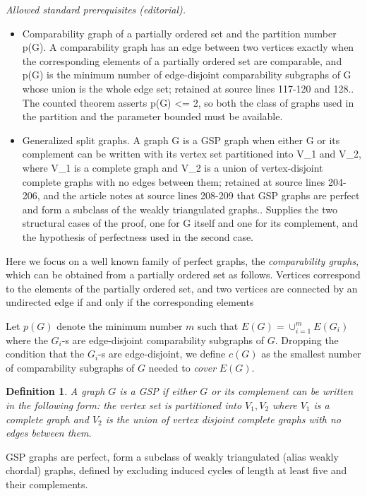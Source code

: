 \documentclass[12pt]{article}
\newtheorem{definition}{Definition}
\begin{document}
\noindent\textit{Allowed standard prerequisites (editorial).}\begin{itemize}
\item Comparability graph of a partially ordered set and the partition number p(G). A comparability graph has an edge between two vertices exactly when the corresponding elements of a partially ordered set are comparable, and p(G) is the minimum number of edge-disjoint comparability subgraphs of G whose union is the whole edge set; retained at source lines 117-120 and 128.. The counted theorem asserts p(G) <= 2, so both the class of graphs used in the partition and the parameter bounded must be available.
\item Generalized split graphs. A graph G is a GSP graph when either G or its complement can be written with its vertex set partitioned into V\_1 and V\_2, where V\_1 is a complete graph and V\_2 is a union of vertex-disjoint complete graphs with no edges between them; retained at source lines 204-206, and the article notes at source lines 208-209 that GSP graphs are perfect and form a subclass of the weakly triangulated graphs.. Supplies the two structural cases of the proof, one for G itself and one for its complement, and the hypothesis of perfectness used in the second case.
\end{itemize}\medskip
Here we focus on a well known family of perfect graphs, the {\em comparability graphs},
which can be obtained from a partially ordered set as follows.
Vertices correspond to the elements of the partially ordered set,
and two vertices are connected by an undirected edge if and only if the corresponding elements

Let $p(G)$ denote the minimum number $m$ such that $E(G)=\cup_{i=1}^m E(G_i)$ where the $G_i$-s are edge-disjoint comparability subgraphs of $G$.
Dropping  the condition that the $G_i$-s are edge-disjoint, we define $c(G)$ as the smallest number of comparability subgraphs of $G$ needed to {\em cover} $E(G)$.

\begin{definition} A graph $G$ is a GSP if either $G$ or its complement can be written in the following form:
  the vertex set is partitioned into $V_1,V_2$ where $V_1$ is a complete graph and $V_2$ is the union of vertex disjoint complete graphs with no edges between them.
\end{definition}

GSP graphs are perfect, form a subclass of weakly triangulated (alias weakly chordal) graphs,
defined by excluding induced cycles of length at least five and their complements.
\end{document}

